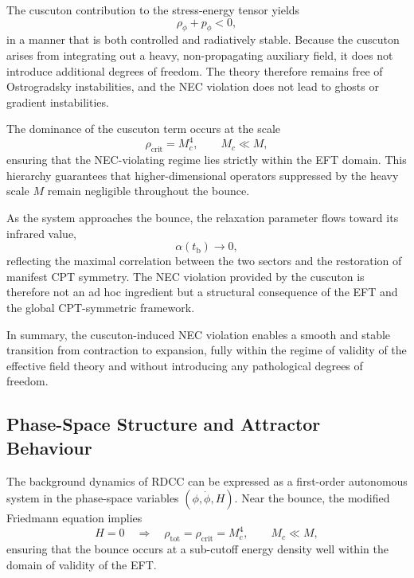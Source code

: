 \documentclass[11pt,a4paper]{article}
\begin{document}
The cuscuton contribution to the stress-energy tensor yields
\begin{equation}
    \rho_{\phi} + p_{\phi} < 0,
\end{equation}
in a manner that is both controlled and radiatively stable. Because the cuscuton
arises from integrating out a heavy, non-propagating auxiliary field, it does not
introduce additional degrees of freedom. The theory therefore remains free of
Ostrogradsky instabilities, and the NEC violation does not lead to ghosts or
gradient instabilities.

The dominance of the cuscuton term occurs at the scale
\begin{equation}
    \rho_{\mathrm{crit}} = M_{c}^{4},
    \qquad M_{c} \ll M,
\end{equation}
ensuring that the NEC-violating regime lies strictly within the EFT domain. This
hierarchy guarantees that higher-dimensional operators suppressed by the heavy
scale \(M\) remain negligible throughout the bounce.

As the system approaches the bounce, the relaxation parameter flows toward its
infrared value,
\begin{equation}
    \alpha(t_{\mathrm{b}}) \longrightarrow 0,
\end{equation}
reflecting the maximal correlation between the two sectors and the restoration of
manifest CPT symmetry. The NEC violation provided by the cuscuton is therefore
not an ad hoc ingredient but a structural consequence of the EFT and the global
CPT-symmetric framework.

In summary, the cuscuton-induced NEC violation enables a smooth and stable
transition from contraction to expansion, fully within the regime of validity of
the effective field theory and without introducing any pathological degrees of
freedom.

\subsection{Phase-Space Structure and Attractor Behaviour}

The background dynamics of RDCC can be expressed as a first-order autonomous
system in the phase-space variables \((\phi, \dot{\phi}, H)\). Near the bounce,
the modified Friedmann equation implies
\begin{equation}
    H = 0
    \quad\Rightarrow\quad
    \rho_{\mathrm{tot}} = \rho_{\mathrm{crit}} = M_{c}^{4},
    \qquad M_{c} \ll M,
\end{equation}
ensuring that the bounce occurs at a sub-cutoff energy density well within the
domain of validity of the EFT.
\end{document}
